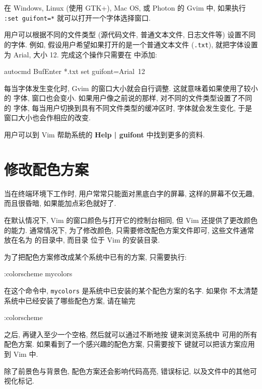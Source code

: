 \begin{warning}
    在 Windows, Linux (使用 GTK+), Mac OS, 或 Photon 的 Gvim 中,
    如果执行 \texttt{:set guifont=*} 就可以打开一个字体选择窗口.
\end{warning}

用户可以根据不同的文件类型 (源代码文件, 普通文本文件, 日志文件等) 
设置不同的字体. 例如, 假设用户希望如果打开的是一个普通文本文件
(\texttt{.txt}),
就把字体设置为 Arial, 大小 12. 完成这个操作只需要在  中添加:
\begin{vimcmd}
autocmd BufEnter *.txt set guifont=Arial\ 12
\end{vimcmd}
每当字体发生变化时, Gvim 的窗口大小就会自行调整. 这就意味着如果使用了较小的
字体, 窗口也会变小. 如果用户像之前说的那样, 对不同的文件类型设置了不同的
字体, 每当用户切换到具有不同文件类型的缓冲区时, 字体就会发生变化, 于是
窗口大小也会作相应的改变.
\begin{warning}
    用户可以到 Vim 帮助系统的 \textbf{Help | guifont} 中找到更多的资料.
\end{warning}
\section{修改配色方案}
\label{sec:changing_color_scheme}
当在终端环境下工作时, 用户常常只能面对黑底白字的屏幕, 这样的屏幕不仅无趣,
而且很昏暗, 如果能加点彩色就好了.

在默认情况下, Vim 的窗口颜色与打开它的控制台相同, 但 Vim 还提供了更改颜色
的能力. 通常情况下, 为了修改颜色, 只需要修改配色方案文件即可, 这些文件通常
放在名为  的目录中, 而目录  位于 Vim 的安装目录.

为了把配色方案修改成某个系统中已有的方案, 只需要执行:
\begin{vimcmd}
:colorscheme mycolors
\end{vimcmd}
在这个命令中, \texttt{mycolors} 是系统中已安装的某个配色方案的名字. 如果你 
不太清楚系统中已经安装了哪些配色方案, 请在输完
\begin{vimcmd}
:colorscheme
\end{vimcmd}
之后, 再键入至少一个空格, 然后就可以通过不断地按  键来浏览系统中
可用的所有配色方案. 如果看到了一个感兴趣的配色方案, 只需要按下 
键就可以把该方案应用到 Vim 中.

除了前景色与背景色, 配色方案还会影响代码高亮, 错误标记, 以及文件中的其他可
视化标记.

